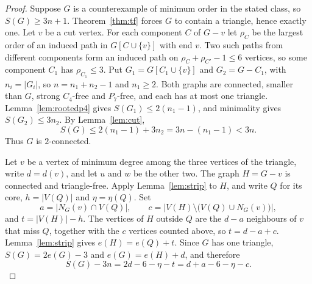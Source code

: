 \documentclass[ASNA]{USG}
\theoremstyle{WBstyletwo}
\numberwithin{equation}{section}
\begin{document}
\begin{proof}
Suppose $G$ is a counterexample of minimum order in the stated class, so $S(G)\ge 3n+1$. Theorem~\ref{thm:tf} forces $G$ to contain a triangle, hence exactly one. Let $v$ be a cut vertex. For each component $C$ of $G-v$ let $\rho_C$ be the largest order of an induced path in $G[C\cup\{v\}]$ with end $v$. Two such paths from different components form an induced path on $\rho_C+\rho_{C'}-1\le 6$ vertices, so some component $C_1$ has $\rho_{C_1}\le 3$. Put $G_1=G[C_1\cup\{v\}]$ and $G_2=G-C_1$, with $n_i=|G_i|$, so $n=n_1+n_2-1$ and $n_1\ge 2$. Both graphs are connected, smaller than $G$, strong $C_4$-free and $P_7$-free, and each has at most one triangle. Lemma~\ref{lem:rootedp4} gives $S(G_1)\le 2(n_1-1)$, and minimality gives $S(G_2)\le 3n_2$. By Lemma~\ref{lem:cut},
\[
S(G)\le 2(n_1-1)+3n_2=3n-(n_1-1)<3n.
\]
Thus $G$ is $2$-connected.

Let $v$ be a vertex of minimum degree among the three vertices of the triangle, write $d=d(v)$, and let $u$ and $w$ be the other two. The graph $H=G-v$ is connected and triangle-free. Apply Lemma~\ref{lem:strip} to $H$, and write $Q$ for its core, $h=|V(Q)|$ and $\eta=\eta(Q)$. Set
\[
a=\bigl|N_G(v)\cap V(Q)\bigr|,\qquad
c=\bigl|V(H)\setminus\bigl(V(Q)\cup N_G(v)\bigr)\bigr|,
\]
and $t=|V(H)|-h$. The vertices of $H$ outside $Q$ are the $d-a$ neighbours of $v$ that miss $Q$, together with the $c$ vertices counted above, so $t=d-a+c$. Lemma~\ref{lem:strip} gives $e(H)=e(Q)+t$. Since $G$ has one triangle, $S(G)=2e(G)-3$ and $e(G)=e(H)+d$, and therefore
\begin{equation}\label{eq:onetri}
S(G)-3n=2d-6-\eta-t=d+a-6-\eta-c.
\end{equation}


\end{proof}
\end{document}
